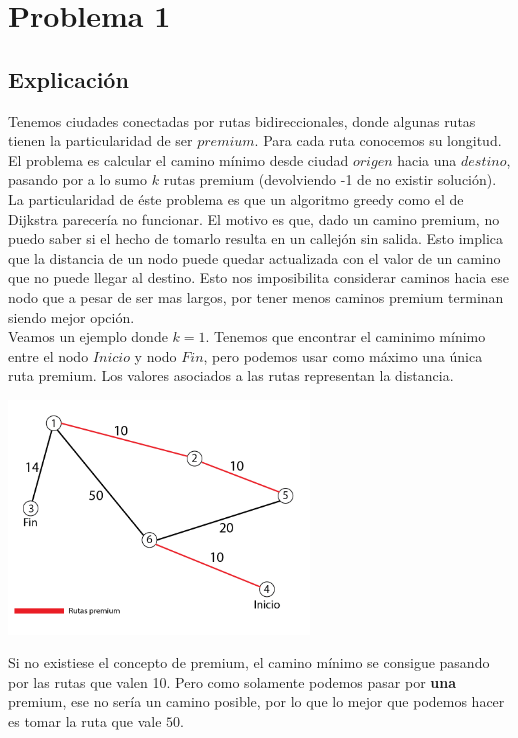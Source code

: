
\section{Problema 1}

\subsection{Explicación}

Tenemos ciudades conectadas por rutas bidireccionales, donde algunas rutas tienen la particularidad de ser $premium$. Para cada ruta conocemos su longitud. El problema es calcular el camino mínimo desde ciudad $origen$ hacia una $destino$, pasando por a lo sumo $k$ rutas premium (devolviendo -1 de no existir solución). \\

La particularidad de éste problema es que un algoritmo greedy como el de Dijkstra parecería no funcionar. El motivo es que, dado un camino premium, no puedo saber si el hecho de tomarlo resulta en un callejón sin salida. Esto implica que la distancia de un nodo puede quedar actualizada con el valor de un camino que no puede llegar al destino. Esto nos imposibilita considerar caminos hacia ese nodo que a pesar de ser mas largos, por tener menos caminos premium terminan siendo mejor opción. \\

Veamos un ejemplo donde $k = 1$. Tenemos que encontrar el caminimo mínimo entre el nodo $Inicio$ y nodo $Fin$, pero podemos usar como máximo una única ruta premium. Los valores asociados a las rutas representan la distancia.

{\centering
	\includegraphics[width=0.6\textwidth]{imagenes/problema1/problema1-c2.png} \\
}

Si no existiese el concepto de premium, el camino mínimo se consigue pasando por las rutas que valen 10. Pero como solamente podemos pasar por \textbf{una} premium, ese no sería un camino posible, por lo que lo mejor que podemos hacer es tomar la ruta que vale $50$.

